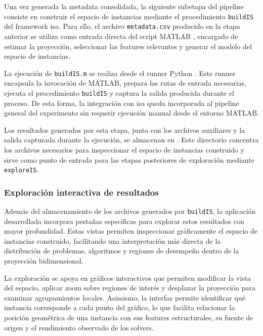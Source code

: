 Una vez generada la metadata consolidada, la siguiente subetapa del pipeline consiste
en construir el espacio de instancias mediante el procedimiento \texttt{buildIS} del
framework \acrshort{isa}.
Para ello, el archivo \texttt{metadata.csv} producido en la etapa anterior se utiliza
como entrada directa del script MATLAB
, encargado de estimar la
proyección, seleccionar las features relevantes y generar el modelo del espacio de
instancias.

La ejecución de \texttt{buildIS.m} se realiza desde el runner Python
.
Este runner encapsula la invocación de MATLAB, prepara las rutas de entrada
necesarias, ejecuta el procedimiento \texttt{buildIS} y captura la salida producida
durante el proceso.
De esta forma, la integración con \acrshort{isa} queda incorporada al pipeline
general del experimento sin requerir ejecución manual desde el entorno MATLAB.

Los resultados generados por esta etapa, junto con los archivos auxiliares y la
salida capturada durante la ejecución, se almacenan en
.
Este directorio concentra los archivos necesarios para inspeccionar el espacio de
instancias construido y sirve como punto de entrada para las etapas posteriores de
exploración mediante \texttt{exploreIS}.

\subsubsection{Exploración interactiva de resultados}
\label{subsec:avance_build_is_exploracion}

Además del almacenamiento de los archivos generados por \texttt{buildIS}, la
aplicación desarrollada incorpora pestañas específicas para explorar estos resultados
con mayor profundidad.
Estas vistas permiten inspeccionar gráficamente el espacio de instancias construido,
facilitando una interpretación más directa de la distribución de problemas,
algoritmos y regiones de desempeño dentro de la proyección bidimensional.

La exploración se apoya en gráficos interactivos que permiten modificar la vista del
espacio, aplicar zoom sobre regiones de interés y desplazar la proyección para
examinar agrupamientos locales.
Asimismo, la interfaz permite identificar qué instancia corresponde a cada punto del
gráfico, lo que facilita relacionar la posición geométrica de una instancia con sus
features estructurales, su fuente de origen y el rendimiento observado de los
solvers.

